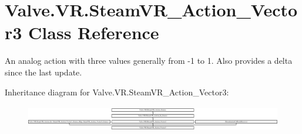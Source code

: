 \hypertarget{class_valve_1_1_v_r_1_1_steam_v_r___action___vector3}{}\section{Valve.\+V\+R.\+Steam\+V\+R\+\_\+\+Action\+\_\+\+Vector3 Class Reference}
\label{class_valve_1_1_v_r_1_1_steam_v_r___action___vector3}


An analog action with three values generally from -\/1 to 1. Also provides a delta since the last update.  


Inheritance diagram for Valve.\+V\+R.\+Steam\+V\+R\+\_\+\+Action\+\_\+\+Vector3\+:\begin{figure}[H]
\begin{center}
\leavevmode
\includegraphics[height=1.163032cm]{class_valve_1_1_v_r_1_1_steam_v_r___action___vector3}
\end{center}
\end{figure}
